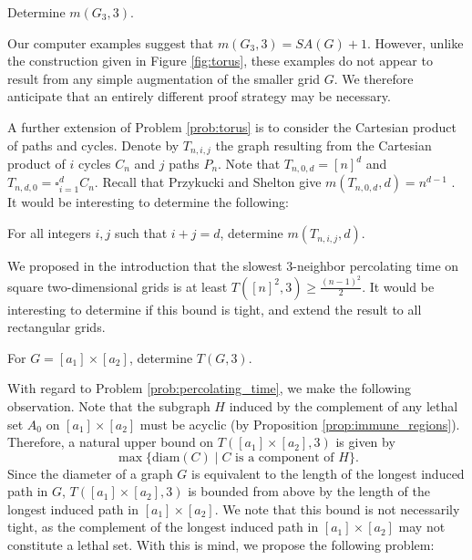\begin{prob}
\label{prob:torus}
Determine $m(G_3,3)$.
\end{prob}

Our computer examples suggest that $m(G_3,3) = SA(G)+1$. However, unlike the construction given in Figure \ref{fig:torus}, these examples do not appear to result from any simple augmentation of the smaller grid $G$. We therefore anticipate that an entirely different proof strategy may be necessary.

A further extension of Problem \ref{prob:torus} is to consider the Cartesian product of paths and cycles. Denote by $T_{n,i,j}$ the graph resulting from the Cartesian product of $i$ cycles $C_n$ and $j$ paths $P_n$. Note that $T_{n,0,d} = [n]^d$ and $T_{n,d,0} = \square_{i=1}^d C_n$. Recall that Przykucki and Shelton give $m(T_{n,0,d},d) = n^{d-1}$ \cite{przykucki:2019}. It would be interesting to determine the following:

\begin{prob}
\label{prob:cartesian_product}
For all integers $i,j$ such that $i+j=d$, determine $m(T_{n,i,j},d)$.
\end{prob}

We proposed in the introduction that the slowest 3-neighbor percolating time on square two-dimensional grids is at least $T([n]^2, 3) \geq \tfrac{(n-1)^2}{2}$. It would be interesting to determine if this bound is tight, and extend the result to all rectangular grids. 

\begin{prob}
\label{prob:percolating_time}
For $G=[a_1] \times [a_2]$, determine $T(G,3)$.
\end{prob}

With regard to Problem \ref{prob:percolating_time}, we make the following observation. Note that the subgraph $H$ induced by the complement of any lethal set $A_0$ on $[a_1] \times [a_2]$ must be acyclic (by Proposition \ref{prop:immune_regions}). Therefore, a natural upper bound on $T([a_1] \times [a_2],3)$ is given by 
$$\max\{\text{diam}(C) \mid C \text{ is a component of } H \}.$$
Since the diameter of a graph $G$ is equivalent to the length of the longest induced path in $G$, $T([a_1] \times [a_2],3)$ is bounded from above by the length of the longest induced path in $[a_1] \times [a_2]$. We note that this bound is not necessarily tight, as the complement of the longest induced path in $[a_1] \times [a_2]$ may not constitute a lethal set. With this is mind, we propose the following problem:

